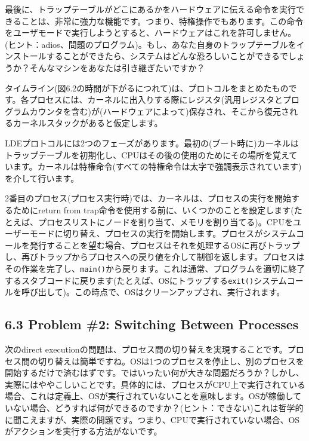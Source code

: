 最後に、トラップテーブルがどこにあるかをハードウェアに伝える命令を実行できることは、非常に強力な機能です。つまり、特権操作でもあります。この命令をユーザモードで実行しようとすると、ハードウェアはこれを許可しません。(ヒント：adios、問題のプログラム)。もし、あなた自身のトラップテーブルをインストールすることができたら、システムはどんな恐ろしいことができるでしょうか？そんなマシンをあなたは引き継ぎたいですか？

タイムライン(図6.2の時間が下がるにつれて)は、プロトコルをまとめたものです。各プロセスには、カーネルに出入りする際にレジスタ(汎用レジスタとプログラムカウンタを含む)が(ハードウェアによって)保存され、そこから復元されるカーネルスタックがあると仮定します。

LDEプロトコルには2つのフェーズがあります。最初の(ブート時に)カーネルはトラップテーブルを初期化し、CPUはその後の使用のためにその場所を覚えています。カーネルは特権命令(すべての特権命令は太字で強調表示されています)を介して行います。

2番目のプロセス(プロセス実行時)では、カーネルは、プロセスの実行を開始するためにreturn
from
trap命令を使用する前に、いくつかのことを設定します(たとえば、プロセスリストにノードを割り当て、メモリを割り当てる)。CPUをユーザーモードに切り替え、プロセスの実行を開始します。プロセスがシステムコールを発行することを望む場合、プロセスはそれを処理するOSに再びトラップし、再びトラップからプロセスへの戻り値を介して制御を返します。プロセスはその作業を完了し、\texttt{main()}から戻ります。これは通常、プログラムを適切に終了するスタブコードに戻ります(たとえば、OSにトラップする\texttt{exit()}システムコールを呼び出して)。この時点で、OSはクリーンアップされ、実行されます。

\hypertarget{problem-2-switching-between-processes}{%
\subsection*{6.3 Problem \#2: Switching Between
Processes}\label{problem-2-switching-between-processes}}

次のdirect
executionの問題は、プロセス間の切り替えを実現することです。プロセス間の切り替えは簡単ですね。OSは1つのプロセスを停止し、別のプロセスを開始するだけで済むはずです。ではいったい何が大きな問題だろうか？しかし、実際にはややこしいことです。具体的には、プロセスがCPU上で実行されている場合、これは定義上、OSが実行されていないことを意味します。OSが稼働していない場合、どうすれば何ができるのですか？(ヒント：できない)これは哲学的に聞こえますが、実際の問題です。つまり、CPUで実行されていない場合、OSがアクションを実行する方法がないです。

